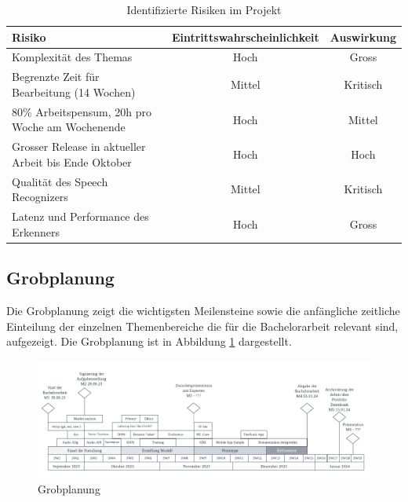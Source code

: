 \documentclass[main.tex]{subfiles} %
\begin{document}
\begin{table}[h]
    \centering
    \begin{tabular}{|l|c|c|}
        \hline
        \textbf{Risiko} & \textbf{Eintrittswahrscheinlichkeit} & \textbf{Auswirkung} \\
        \hline
        Komplexität des Themas & Hoch & Gross \\
        \hline
        Begrenzte Zeit für Bearbeitung (14 Wochen) & Mittel & Kritisch \\
        \hline
        80\% Arbeitspensum, 20h pro Woche am Wochenende & Hoch & Mittel \\
        \hline
        Grosser Release in aktueller Arbeit bis Ende Oktober & Hoch & Hoch \\
        \hline
        Qualität des Speech Recognizers & Mittel & Kritisch \\
        \hline
        Latenz und Performance des Erkenners & Hoch & Gross \\
        \hline
    \end{tabular}
    \caption{Identifizierte Risiken im Projekt}
    \label{tab:risiken}
\end{table}



\begin{landscape}
    \subsection{Grobplanung}
    Die Grobplanung zeigt die wichtigsten Meilensteine sowie die anfängliche zeitliche Einteilung 
    der einzelnen Themenbereiche die für die Bachelorarbeit relevant sind, aufgezeigt. Die
    Grobplanung ist in Abbildung \ref{fig:grobplanung} dargestellt.

    \begin{figure}[!htb]
        \centering
        \includegraphics[width=\linewidth]{img/projectplan.pdf}
        \caption{Grobplanung}
        \label{fig:grobplanung}
    \end{figure}
\end{landscape}
\end{document}
